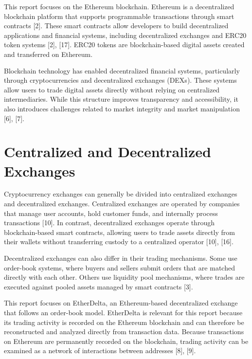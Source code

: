 \documentclass[language=english,thesis=bachelor,nosecondtitle,onesided,faculty=cb]{hsmw-thesis}
\begin{document}
This report focuses on the Ethereum blockchain. Ethereum is a decentralized blockchain platform that supports programmable transactions through smart contracts [2]. These smart contracts allow developers to build decentralized applications and financial systems, including decentralized exchanges and ERC20 token systems [2], [17]. ERC20 tokens are blockchain-based digital assets created and transferred on Ethereum. 

Blockchain technology has enabled decentralized financial systems, particularly through cryptocurrencies and decentralized exchanges (DEXs). These systems allow users to trade digital assets directly without relying on centralized intermediaries. While this structure improves transparency and accessibility, it also introduces challenges related to market integrity and market manipulation [6], [7].

	\section{Centralized and Decentralized Exchanges}
Cryptocurrency exchanges can generally be divided into centralized exchanges and decentralized exchanges. Centralized exchanges are operated by companies that manage user accounts, hold customer funds, and internally process transactions [10]. In contrast, decentralized exchanges operate through blockchain-based smart contracts, allowing users to trade assets directly from their wallets without transferring custody to a centralized operator [10], [16].

Decentralized exchanges can also differ in their trading mechanisms. Some use order-book systems, where buyers and sellers submit orders that are matched directly with each other. Others use liquidity pool mechanisms, where trades are executed against pooled assets managed by smart contracts [3].

This report focuses on EtherDelta, an Ethereum-based decentralized exchange that follows an order-book model. EtherDelta is relevant for this report because its trading activity is recorded on the Ethereum blockchain and can therefore be reconstructed and analyzed directly from transaction data. Because transactions on Ethereum are permanently recorded on the blockchain, trading activity can be examined as a network of interactions between addresses [8], [9].
\end{document}
